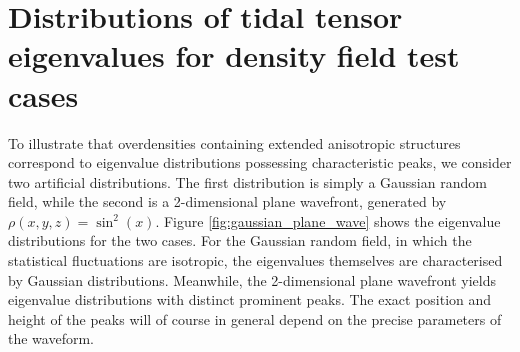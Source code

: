 \documentclass[a4paper,11pt]{article}
\begin{document}
\appendix


\section{Distributions of tidal tensor eigenvalues for density field test cases}\label{app:prob_distro_eg}

To illustrate that overdensities containing extended anisotropic structures correspond to eigenvalue distributions possessing characteristic peaks, we consider two artificial distributions. The first distribution is simply a Gaussian random field, while the second is a 2-dimensional plane wavefront, generated by $\rho(x,y,z)=\sin^2{(x)}$. Figure \ref{fig:gaussian_plane_wave} shows the eigenvalue distributions for the two cases. For the Gaussian random field, in which the statistical fluctuations are isotropic, the eigenvalues themselves are characterised by Gaussian distributions. Meanwhile, the 2-dimensional plane wavefront yields eigenvalue distributions with distinct prominent peaks. The exact position and height of the peaks will of course in general depend on the precise parameters of the waveform.
\end{document}
